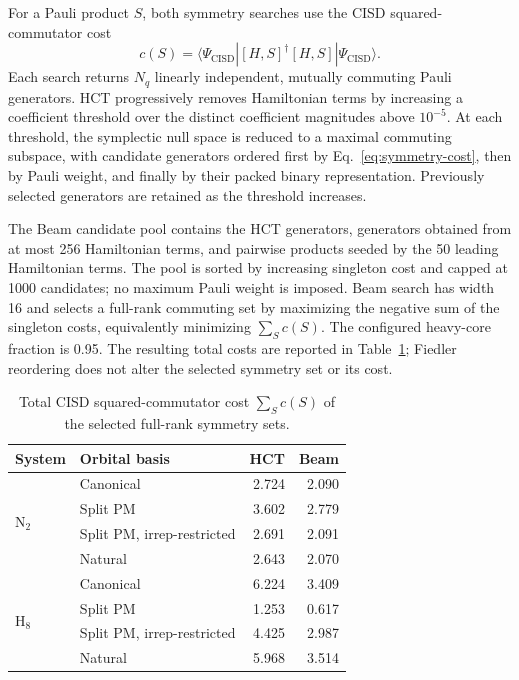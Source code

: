 \documentclass[a4paper,onecolumn,10pt]{article}
\newcommand{\CISD}{\mathrm{CISD}}
\begin{document}
For a Pauli product $S$, both symmetry searches use the CISD squared-commutator
cost
\begin{equation}
    c(S)=
    \langle\Psi_{\CISD}|[H,S]^\dagger[H,S]|\Psi_{\CISD}\rangle.
    \label{eq:symmetry-cost}
\end{equation}
Each search returns $N_q$ linearly independent, mutually commuting Pauli
generators.  HCT progressively removes Hamiltonian terms by increasing a
coefficient threshold over the distinct coefficient magnitudes above
$10^{-5}$.  At each threshold, the symplectic null space is reduced to a
maximal commuting subspace, with candidate generators ordered first by
Eq.~\eqref{eq:symmetry-cost}, then by Pauli weight, and finally by their packed
binary representation.  Previously selected generators are retained as the
threshold increases.

The Beam candidate pool contains the HCT generators, generators obtained from
at most 256 Hamiltonian terms, and pairwise products seeded by the 50 leading
Hamiltonian terms.  The pool is sorted by increasing singleton cost and capped
at 1000 candidates; no maximum Pauli weight is imposed.  Beam search has width
16 and selects a full-rank commuting set by maximizing the negative sum of the
singleton costs, equivalently minimizing $\sum_S c(S)$.  The configured
heavy-core fraction is 0.95.  The resulting total costs are reported in
Table~\ref{tab:symmetry-costs}; Fiedler reordering does not alter the selected
symmetry set or its cost.

\begin{table}[htbp]
\centering
\caption{Total CISD squared-commutator cost $\sum_S c(S)$ of the selected
full-rank symmetry sets.}
\label{tab:symmetry-costs}
\begin{tabular}{llrr}
\toprule
System & Orbital basis & HCT & Beam \\
\midrule
\multirow{4}{*}{N$_2$}
 & Canonical                  & 2.724 & 2.090 \\
 & Split PM                   & 3.602 & 2.779 \\
 & Split PM, irrep-restricted & 2.691 & 2.091 \\
 & Natural                    & 2.643 & 2.070 \\
\midrule
\multirow{4}{*}{H$_8$}
 & Canonical                  & 6.224 & 3.409 \\
 & Split PM                   & 1.253 & 0.617 \\
 & Split PM, irrep-restricted & 4.425 & 2.987 \\
 & Natural                    & 5.968 & 3.514 \\
\bottomrule
\end{tabular}
\end{table}
\end{document}
